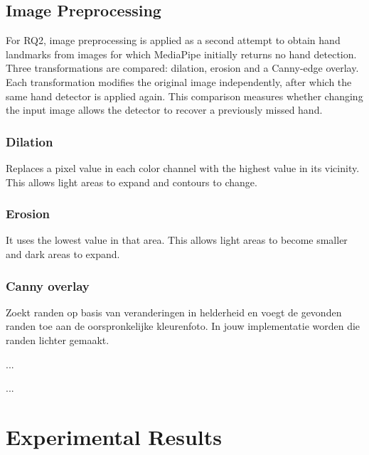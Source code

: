 \documentclass{article}
\begin{document}
\subsection{Image Preprocessing}

For RQ2, image preprocessing is applied as a second attempt to obtain hand landmarks from images for which MediaPipe initially returns no hand detection. Three transformations are compared: dilation, erosion and a Canny-edge overlay. Each transformation modifies the original image independently, after which the same hand detector is applied again. This comparison measures whether changing the input image allows the detector to recover a previously missed hand.

    \subsubsection{Dilation}
        Replaces a pixel value in each color channel with the highest value in its vicinity. This allows light areas to expand and contours to change.

    \subsubsection{Erosion}
    	It uses the lowest value in that area. This allows light areas to become smaller and dark areas to expand.

    \subsubsection{Canny overlay}
        Zoekt randen op basis van veranderingen in helderheid en voegt de gevonden randen toe aan de oorspronkelijke kleurenfoto. In jouw implementatie worden die randen lichter gemaakt.




\par\noindent ...\par\medskip

\par\noindent ...\par\medskip

\section{Experimental Results}
\end{document}
